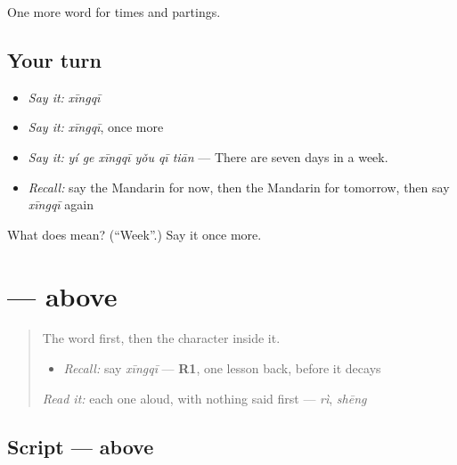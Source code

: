 \begin{grammarlens}[title={What you've built}]
One more word for times and partings.
\end{grammarlens}

\subsection*{Your turn}
\begin{itemize}
\raggedright
  \item \emph{Say it:} \emph{xīngqī}
  \item \emph{Say it:} \emph{xīngqī}, once more
  \item \emph{Say it:} \emph{yí ge xīngqī yǒu qī tiān} — There are seven days in a week.
  \item \emph{Recall:} say the Mandarin for now, then the Mandarin for tomorrow, then say \emph{xīngqī} again
\end{itemize}

\begin{tcolorbox}[breakable,colback=teal!4,colframe=teal!35!black,title={Before you move on}]
What does  mean? (\textquotedblleft{}Week\textquotedblright{}.) Say it once more.
\end{tcolorbox}
\section[\texorpdfstring{\zh{星} (xīng)}{星 (xīng)}]{ —  above }

\label{lesson:ZH-W46-xing}



\begin{quote}
The word first, then the character inside it.

\begin{itemize}
\raggedright
  \item \emph{Recall:} say \emph{xīngqī} — \textbf{R1}, one lesson back, before it decays
\end{itemize}

\begin{quote}
 
\end{quote}

\emph{Read it:} each one aloud, with nothing said first — \emph{rì}, \emph{shēng}
\end{quote}

\subsection*{Script —  above }


